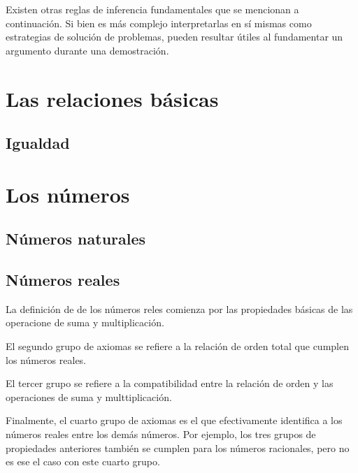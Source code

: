 Existen otras reglas de inferencia fundamentales que se mencionan a continuación. Si bien es más complejo interpretarlas en sí mismas como estrategias de solución de problemas, pueden resultar útiles al fundamentar un argumento durante una demostración.











\section{Las relaciones básicas}
\subsection{Igualdad}




\section{Los números}
\subsection{Números naturales}



\subsection{Números reales}

La definición de de los números reles comienza por las propiedades básicas de las operacione de suma y multiplicación.



El segundo grupo de axiomas se refiere a la relación de orden total que cumplen los números reales.



El tercer grupo se refiere a la compatibilidad entre la relación de orden y las operaciones de suma y multtiplicación.



Finalmente, el cuarto grupo de axiomas es el que efectivamente identifica a los números reales entre los demás números. Por ejemplo, los tres grupos de propiedades anteriores también se cumplen para los números racionales, pero no es ese el caso con este cuarto grupo.



